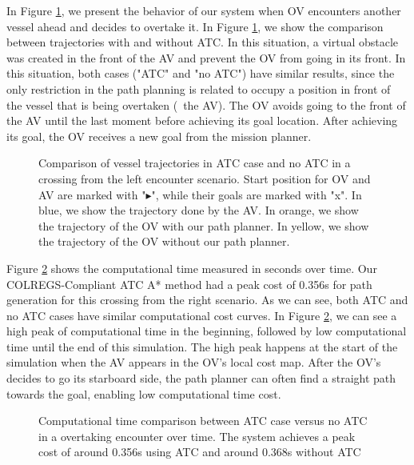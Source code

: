        In Figure \ref{fig:plot_ov_w_vs_wo}, we present the behavior of our system when \ac{OV} encounters another vessel ahead and decides to overtake it. In Figure \ref{fig:plot_ov_w_vs_wo}, we show the comparison between trajectories with and without \ac{ATC}. In this situation, a virtual obstacle was created in the front of the \ac{AV} and prevent the \ac{OV} from going in its front. In this situation, both cases ("ATC" and "no ATC") have similar results, since the only restriction in the path planning is related to occupy a position in front of the vessel that is being overtaken (\ie{}~the \ac{AV}). The \ac{OV} avoids going to the front of the \ac{AV} until the last moment before achieving its goal location. After achieving its goal, the \ac{OV} receives a new goal from the mission planner.
        
        \begin{figure}[H]
            \centering
            
            \caption{Comparison of vessel trajectories in \ac{ATC} case and no \ac{ATC} in a crossing from the left encounter scenario. Start position for \ac{OV} and \ac{AV} are marked with "$\blacktriangleright$", while their goals are marked with "x". In blue, we show the trajectory done by the \ac{AV}. In orange, we show the trajectory of the \ac{OV} with our path planner. In yellow, we show the trajectory of the \ac{OV} without our path planner.}
            \label{fig:plot_ov_w_vs_wo}
        \end{figure}
        
        Figure \ref{fig:plot_ov_w_vs_wo_CT} shows the computational time measured in seconds over time. Our \ac{COLREGS}-Compliant \ac{ATC} A* method had a peak cost of 0.356s for path generation for this crossing from the right scenario. As we can see, both \ac{ATC} and no \ac{ATC} cases have similar computational cost curves. In Figure \ref{fig:plot_ov_w_vs_wo_CT}, we can see a high peak of computational time in the beginning, followed by low computational time until the end of this simulation. The high peak happens at the start of the simulation when the \ac{AV} appears in the \ac{OV}'s local cost map. After the \ac{OV}'s decides to go its starboard side, the path planner can often find a straight path towards the goal, enabling low computational time cost. 
        
        \begin{figure}
            \centering
                
                \caption{Computational time comparison between \ac{ATC} case versus no \ac{ATC} in a overtaking encounter over time. The system achieves a peak cost of around 0.356s using \ac{ATC} and around 0.368s without \ac{ATC}}
                \label{fig:plot_ov_w_vs_wo_CT}
        \end{figure}
        
